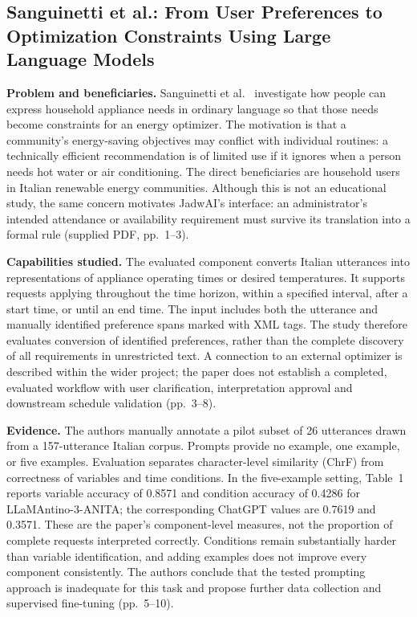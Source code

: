 \subsection{Sanguinetti et al.: From User Preferences to Optimization Constraints Using Large Language Models}
\textbf{Problem and beneficiaries.} Sanguinetti et al.~\cite{sanguinetti2025preferences} investigate how people can express household appliance needs in ordinary language so that those needs become constraints for an energy optimizer. The motivation is that a community's energy-saving objectives may conflict with individual routines: a technically efficient recommendation is of limited use if it ignores when a person needs hot water or air conditioning. The direct beneficiaries are household users in Italian renewable energy communities. Although this is not an educational study, the same concern motivates JadwAI's interface: an administrator's intended attendance or availability requirement must survive its translation into a formal rule (supplied PDF, pp.~1--3).

\textbf{Capabilities studied.} The evaluated component converts Italian utterances into representations of appliance operating times or desired temperatures. It supports requests applying throughout the time horizon, within a specified interval, after a start time, or until an end time. The input includes both the utterance and manually identified preference spans marked with XML tags. The study therefore evaluates conversion of identified preferences, rather than the complete discovery of all requirements in unrestricted text. A connection to an external optimizer is described within the wider project; the paper does not establish a completed, evaluated workflow with user clarification, interpretation approval and downstream schedule validation (pp.~3--8).

\textbf{Evidence.} The authors manually annotate a pilot subset of 26 utterances drawn from a 157-utterance Italian corpus. Prompts provide no example, one example, or five examples. Evaluation separates character-level similarity (ChrF) from correctness of variables and time conditions. In the five-example setting, Table~1 reports variable accuracy of 0.8571 and condition accuracy of 0.4286 for LLaMAntino-3-ANITA; the corresponding ChatGPT values are 0.7619 and 0.3571. These are the paper's component-level measures, not the proportion of complete requests interpreted correctly. Conditions remain substantially harder than variable identification, and adding examples does not improve every component consistently. The authors conclude that the tested prompting approach is inadequate for this task and propose further data collection and supervised fine-tuning (pp.~5--10).

